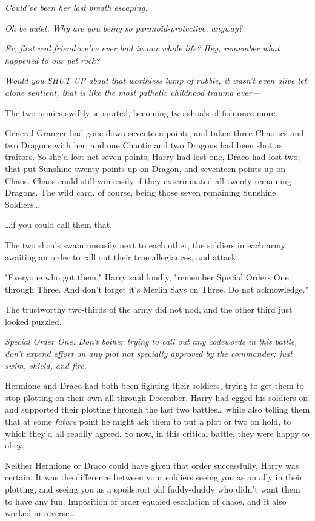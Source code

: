 \emph{Could've been her last breath escaping.}

\emph{Oh be quiet. Why are you being so paranoid-protective, anyway?}

\emph{Er, first real friend we've ever had in our whole life? Hey, remember 
what happened to our pet rock?}

\emph{Would you SHUT UP about that worthless lump of rubble, it wasn't even 
alive let alone sentient, that is like the most pathetic childhood trauma 
ever---}

The two armies swiftly separated, becoming two shoals of fish once more.

General Granger had gone down seventeen points, and taken three Chaotics and 
two Dragons with her; and one Chaotic and two Dragons had been shot as 
traitors. So she'd lost net seven points, Harry had lost one, Draco had lost 
two; that put Sunshine twenty points up on Dragon, and seventeen points up on 
Chaos. Chaos could still win easily if they exterminated all twenty remaining 
Dragons. The wild card, of course, being those seven remaining Sunshine 
Soldiers{\ldots}

{\ldots}if you could call them that.

The two shoals swam uneasily next to each other, the soldiers in each army 
awaiting an order to call out their true allegiances, and attack{\ldots}

"Everyone who got them," Harry said loudly, "remember Special Orders One 
through Three. And don't forget it's Merlin Says on Three. Do not acknowledge."

The trustworthy two-thirds of the army did not nod, and the other third just 
looked puzzled.

\emph{Special Order One: Don't bother trying to call out any codewords in this 
battle, don't expend effort on any plot not specially approved by the 
commander; just swim, shield, and fire.}

Hermione and Draco had both been fighting their soldiers, trying to get them to 
stop plotting on their own all through December. Harry had egged his soldiers 
on and supported their plotting through the last two battles{\ldots} while also 
telling them that at some \emph{future} point he might ask them to put a plot 
or two on hold, to which they'd all readily agreed. So now, in this critical 
battle, they were happy to obey.

Neither Hermione or Draco could have given that order successfully, Harry was 
certain. It was the difference between your soldiers seeing you as an ally in 
their plotting, and seeing you as a spoilsport old fuddy-duddy who didn't want 
them to have any fun. Imposition of order equaled escalation of chaos, and it 
also worked in reverse{\ldots}

